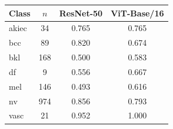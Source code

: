 \begin{tabular}{@{}lccc@{}}
\toprule
Class & $n$ & ResNet-50 & ViT-Base/16 \\ \midrule
akiec & 34 & 0.765 & 0.765 \\
bcc & 89 & 0.820 & 0.674 \\
bkl & 168 & 0.500 & 0.583 \\
df & 9 & 0.556 & 0.667 \\
mel & 146 & 0.493 & 0.616 \\
nv & 974 & 0.856 & 0.793 \\
vasc & 21 & 0.952 & 1.000 \\
\bottomrule
\end{tabular}
